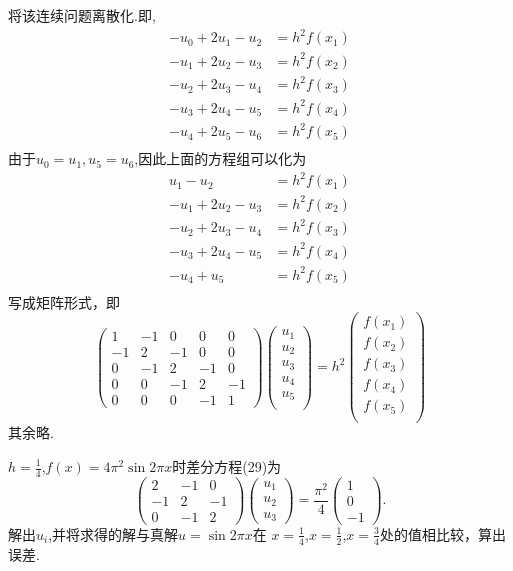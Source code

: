 ﻿\documentclass{book} \usepackage{exsheets} \usepackage{xeCJK}
\begin{document}
\begin{solution}
 将该连续问题离散化.即,
\begin{align*}
-u_{0}+2u_1-u_2&=h^2f(x_1)\\
-u_1+2u_2-u_3&=h^2f(x_2)\\
-u_2+2u_3-u_4&=h^2f(x_3)\\
-u_3+2u_4-u_5&=h^2f(x_4)\\
-u_4+2u_5-u_6&=h^2f(x_5)\\
\end{align*}
由于$u_0=u_1,u_5=u_6$,因此上面的方程组可以化为
\begin{align*}
  u_1-u_2&=h^2f(x_1)\\
-u_1+2u_2-u_3&=h^2f(x_2)\\
-u_2+2u_3-u_4&=h^2f(x_3)\\
-u_3+2u_4-u_5&=h^2f(x_4)\\
-u_4+u_5&=h^2f(x_5)\\
\end{align*}
写成矩阵形式，即
$$
\begin{pmatrix}
1&-1&0&0&0\\
-1&2&-1&0&0\\
0&-1&2&-1&0\\
0&0&-1&2&-1\\
0&0&0&-1&1
\end{pmatrix}
\begin{pmatrix}
u_1\\
u_2\\
u_3\\
u_4\\
u_5\\
\end{pmatrix}=h^{2}
\begin{pmatrix}
f(x_1)\\
f(x_2)\\
f(x_3)\\
f(x_4)\\
f(x_5)\\
\end{pmatrix}
$$
其余略.
\end{solution}
\begin{question}
  $h=\frac{1}{4}$,$f(x)=4\pi^2\sin 2\pi x$时差分方程(29)为
$$
\begin{pmatrix}
  2&-1&0\\
 -1&2&-1\\
0&-1&2
\end{pmatrix}
\begin{pmatrix}
  u_1\\
u_2\\
u_3
\end{pmatrix}=\frac{\pi^2}{4}
\begin{pmatrix}
  1\\
0\\
-1
\end{pmatrix}.
$$
解出$u_i$,并将求得的解与真解$u=\sin 2\pi x$在
$x=\frac{1}{4}$,$x=\frac{1}{2}$,$x=\frac{3}{4}$处的值相比较，算出误差.
\end{question}
\end{document}
